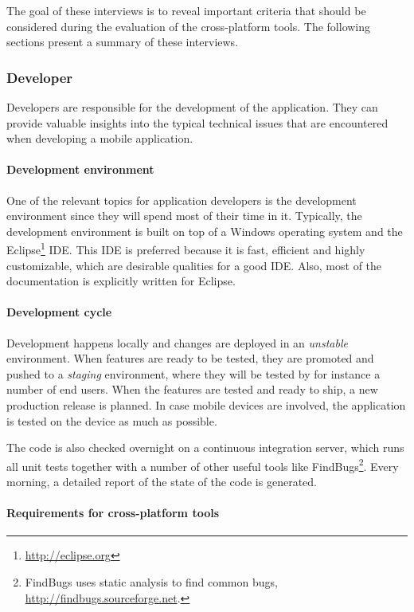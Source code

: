 The goal of these interviews is to reveal important criteria that should be considered during the evaluation of the cross-platform tools. The following sections present a summary of these interviews.

\subsubsection{Developer}

Developers are responsible for the development of the application. They can provide valuable insights into the typical technical issues that are encountered when developing a mobile application.

\paragraph{Development environment}

One of the relevant topics for application developers is the development environment since they will spend most of their time in it. Typically, the development environment is built on top of a Windows operating system and the Eclipse\footnote{\url{http://eclipse.org}} IDE. This IDE is preferred because it is fast, efficient and highly customizable, which are desirable qualities for a good IDE. Also, most of the documentation is explicitly written for Eclipse. 

\paragraph{Development cycle}

Development happens locally and changes are deployed in an \emph{unstable}  environment. When features are ready to be tested, they are promoted and pushed to a \emph{staging} environment, where they will be tested by for instance a number of end users. When the features are tested and ready to ship, a new production release is planned. In case mobile devices are involved, the application is tested on the device as much as possible.

The code is also checked overnight on a continuous integration server, which runs all unit tests together with a number of other useful tools like FindBugs\footnote{FindBugs uses static analysis to find common bugs, \url{http://findbugs.sourceforge.net}.}. Every morning, a detailed report of the state of the code is generated.

\paragraph{Requirements for cross-platform tools}

